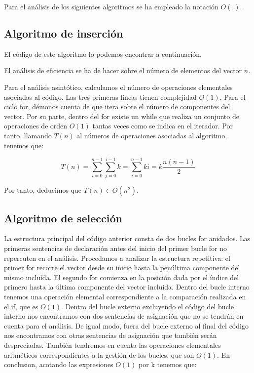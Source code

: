 \documentclass{homework}
\begin{document}
    Para el análisis de los siguientes algoritmos se ha empleado la notación $O(.)$. 

    \subsection{Algoritmo de inserción}

    El código de este algoritmo lo podemos encontrar a continuación.

    
    
    El análisis de eficiencia se ha de hacer sobre el número de elementos del vector $n$. 

    Para el análisis asintótico, calculamos el número de operaciones elementales asociadas al código. 
    Las tres primeras líneas tienen complejidad $O(1)$. Para el ciclo for, démonos cuenta de que itera sobre el número de
    componentes del vector. Por su parte, dentro del for existe un while que realiza un conjunto de operaciones de orden
    $O(1)$ tantas veces como se indica en el iterador. Por tanto, llamando $T(n)$ al números de operaciones asociadas
    al algoritmo, tenemos que:

    \begin{equation*}
        T(n) = \sum_{i=0}^{n-1} \sum_{j=0}^{i-1} k = \sum_{i=0}^{n-1} ki = k \frac{n(n-1)}{2} 
    \end{equation*}

    Por tanto, deducimos que $T(n) \in O(n^2)$. 

    \subsection{Algoritmo de selección}

        

    La estructura principal del código anterior consta de dos bucles for anidados. Las primeras sentencias de declaración antes del inicio del primer 
    bucle for no repercuten en el análisis. Procedamos a analizar la estructura repetitiva: el primer for recorre el vector desde su inicio hasta
    la penúltima componente del mismo incluída. El segundo for comienza en la posición dada por el índice del primero hasta la última componente del vector incluída.
    Dentro del bucle interno tenemos una operación elemental correspondiente a la comparación realizada en el if, que es $O(1)$. Dentro del bucle externo excluyendo 
    el código del bucle interno nos encontramos con dos sentencias de asignación que no se tendrán en cuenta para el análisis. De igual modo, fuera del bucle externo
    al final del código nos encontramos con otras sentencias de asignación que también serán despreciadas. También tendremos en cuenta las operaciones elementales
    aritméticos correspondientes a la gestión de los bucles, que son $O(1)$. En conclusion, acotando las expresiones $O(1)$ por k tenemos que: 
\end{document}
